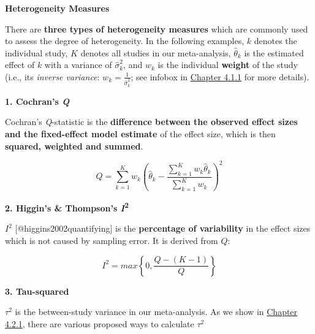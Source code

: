 \documentclass[]{book}
\begin{document}
\begin{rmdinfo}
\textbf{Heterogeneity Measures}

There are \textbf{three types of heterogeneity measures} which are
commonly used to assess the degree of heterogeneity. In the following
examples, \(k\) denotes the individual study, \(K\) denotes all studies
in our meta-analysis, \(\hat \theta_k\) is the estimated effect of \(k\)
with a variance of \(\hat \sigma^{2}_k\), and \(w_k\) is the individual
\textbf{weight} of the study (i.e., its \emph{inverse variance}:
\(w_k = \frac{1}{\hat \sigma^{2}_k}\); see infobox in
\protect\hyperlink{fixed}{Chapter 4.1.1} for more details).

\textbf{1. Cochran's \emph{Q} }

Cochran's \emph{Q}-statistic is the \textbf{difference between the
observed effect sizes and the fixed-effect model estimate} of the effect
size, which is then \textbf{squared, weighted and summed}.

\[ Q = \sum\limits_{k=1}^K w_k (\hat\theta_k  - \frac{\sum\limits_{k=1}^K w_k \hat\theta_k}{\sum\limits_{k=1}^K w_k})^{2}\]

\textbf{2. Higgin's \& Thompson's \emph{I}\textsuperscript{2} }

\(I^{2}\) {[}@higgins2002quantifying{]} is the \textbf{percentage of
variability} in the effect sizes which is not caused by sampling error.
It is derived from \(Q\):

\[I^{2} = max \left\{0, \frac{Q-(K-1)}{Q}  \right\}\]

\textbf{3. Tau-squared}

\(\tau^{2}\) is the between-study variance in our meta-analysis. As we
show in \protect\hyperlink{tau2}{Chapter 4.2.1}, there are various
proposed ways to calculate \(\tau^{2}\)
\end{rmdinfo}
\end{document}
